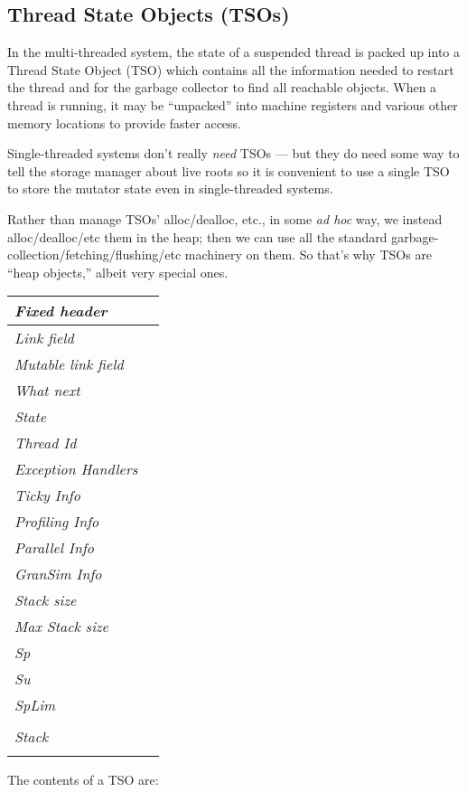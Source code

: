 \documentclass[11pt]{article}
\newcommand{\Subsection}[2]{\subsection{#1}\label{sec:#2}}
\begin{document}
\Subsection{Thread State Objects (TSOs)}{TSO}

In the multi-threaded system, the state of a suspended thread is
packed up into a Thread State Object (TSO) which contains all the
information needed to restart the thread and for the garbage collector
to find all reachable objects.  When a thread is running, it may be
``unpacked'' into machine registers and various other memory locations
to provide faster access.

Single-threaded systems don't really \emph{need\/} TSOs --- but they do
need some way to tell the storage manager about live roots so it is
convenient to use a single TSO to store the mutator state even in
single-threaded systems.

Rather than manage TSOs' alloc/dealloc, etc., in some \emph{ad hoc}
way, we instead alloc/dealloc/etc them in the heap; then we can use
all the standard garbage-collection/fetching/flushing/etc machinery on
them.  So that's why TSOs are ``heap objects,'' albeit very special
ones.
\begin{center}
\begin{tabular}{|l|l|}
   \hline \emph{Fixed header}
\\ \hline \emph{Link field}
\\ \hline \emph{Mutable link field}
\\ \hline \emph{What next}
\\ \hline \emph{State}
\\ \hline \emph{Thread Id}
\\ \hline \emph{Exception Handlers}
\\ \hline \emph{Ticky Info}
\\ \hline \emph{Profiling Info}
\\ \hline \emph{Parallel Info}
\\ \hline \emph{GranSim Info}
\\ \hline \emph{Stack size}
\\ \hline \emph{Max Stack size}
\\ \hline \emph{Sp}
\\ \hline \emph{Su}
\\ \hline \emph{SpLim}
\\ \hline 
\\
          \emph{Stack}
\\
\\ \hline 
\end{tabular}
\end{center}
The contents of a TSO are:
\end{document}
